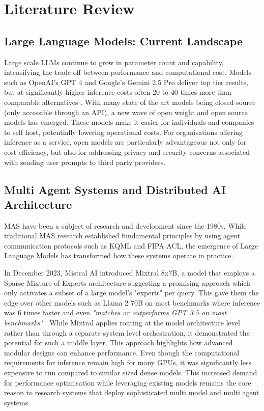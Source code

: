 \chapter{Literature Review}
\label{ch:lit_rev} %

\section{Large Language Models: Current Landscape}

Large scale LLMs continue to grow in parameter count and capability, intensifying the trade off between performance and computational cost. Models such as OpenAI's GPT 4 and Google's Gemini 2.5 Pro deliver top tier results, but at significantly higher inference costs often 20 to 40 times more than comparable alternatives \citep{openai-gpt4-pricing}. With many state of the art models being closed source (only accessible through an API), a new wave of open weight and open source models has emerged. These models make it easier for individuals and companies to self host, potentially lowering operational costs. For organisations offering inference as a service, open models are particularly advantageous not only for cost efficiency, but also for addressing privacy and security concerns associated with sending user prompts to third party providers.

\section{Multi Agent Systems and Distributed AI Architecture}

MAS have been a subject of research and development since the 1980s. While traditional MAS research established fundamental principles by using agent communication protocols such as KQML and FIPA ACL, the emergence of Large Language Models has transformed how these systems operate in practice.

In December 2023, Mistral AI introduced Mixtral 8x7B, a model that employs a Sparse Mixture of Experts architecture suggesting a promising approach which only activates a subset of a large model's "experts" per query. This gave them the edge over other models such as Llama 2 70B on most benchmarks where inference was 6 times faster and even \textit{"matches or outperforms GPT 3.5 on most benchmarks"} \cite{hu2024routerbenchbenchmarkmultillmrouting}. While Mixtral applies routing at the model architecture level rather than through a separate system level orchestration, it demonstrated the potential for such a middle layer. This approach highlights how advanced modular designs can enhance performance. Even though the computational requirements for inference remain high for many GPUs, it was significantly less expensive to run compared to similar sized dense models. This increased demand for performance optimisation while leveraging existing models remains the core reason to research systems that deploy sophisticated multi model and multi agent systems.

